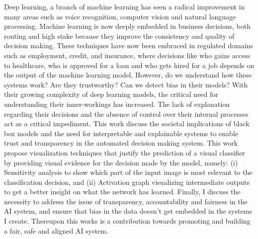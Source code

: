 %
%
%

\begin{publicabstract}

Deep learning, a branch of machine learning has seen a radical improvement in many areas such as voice recognition, computer vision and natural language processing. Machine learning is now deeply embedded in business decisions, both routing and high stake because they improve the consistency and quality of decision making. These techniques have now been embraced in regulated domains such as employment, credit, and insurance, where decisions like who gains access to healthcare, who is approved for a loan and who gets hired for a job depends on the output of the machine learning model. However, do we understand how these systems work? Are they trustworthy? Can we detect bias in their models? With their growing complexity of deep learning models,  the critical need for understanding their inner-workings has increased. The lack of explanation regarding their decisions and the absence of control over their internal processes act as a critical impediment. This work discuss the societal implications of black box models and the need for interpretable and explainable systems to enable trust and transparency in the automated decision making system. This work propose visualization techniques that justify the prediction of a visual classifier by providing visual evidence for the decision made by the model, namely: (i) Sensitivity analysis to  show which part of the  input image  is  most  relevant  to  the  classification decision, and (ii) Activation graph visualizing intermediate outputs to get a better insight on what the network has learned. Finally, I discuss the necessity to address the issue of transparency, accountability and fairness in the AI system, and ensure that bias in the data doesn't get embedded in the systems I create. Thereupon this works is a contribution towards promoting and building a fair, safe and aligned AI system.

\end{publicabstract}


